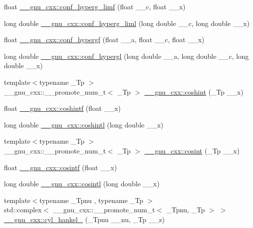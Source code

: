 \begin{DoxyCompactItemize}
\item 
float \hyperlink{group__gnu__math__spec__func_ga609879a370bc4e9fc70563806bc49cb9}{\+\_\+\+\_\+gnu\+\_\+cxx\+::conf\+\_\+hyperg\+\_\+limf} (float \+\_\+\+\_\+c, float \+\_\+\+\_\+x)
\item 
long double \hyperlink{group__gnu__math__spec__func_ga367be9b77eb1f9ccc2971d5300da48d1}{\+\_\+\+\_\+gnu\+\_\+cxx\+::conf\+\_\+hyperg\+\_\+liml} (long double \+\_\+\+\_\+c, long double \+\_\+\+\_\+x)
\item 
float \hyperlink{group__gnu__math__spec__func_gabd18e600aa78c3f2b2f835039506c810}{\+\_\+\+\_\+gnu\+\_\+cxx\+::conf\+\_\+hypergf} (float \+\_\+\+\_\+a, float \+\_\+\+\_\+c, float \+\_\+\+\_\+x)
\item 
long double \hyperlink{group__gnu__math__spec__func_ga0a9853f30d8fa515a12cd45a92da832e}{\+\_\+\+\_\+gnu\+\_\+cxx\+::conf\+\_\+hypergl} (long double \+\_\+\+\_\+a, long double \+\_\+\+\_\+c, long double \+\_\+\+\_\+x)
\item 
{\footnotesize template$<$typename \+\_\+\+Tp $>$ }\\\+\_\+\+\_\+gnu\+\_\+cxx\+::\+\_\+\+\_\+promote\+\_\+num\+\_\+t$<$ \+\_\+\+Tp $>$ \hyperlink{group__gnu__math__spec__func_gaceef7e29a05055fa1e1300301f51f139}{\+\_\+\+\_\+gnu\+\_\+cxx\+::coshint} (\+\_\+\+Tp \+\_\+\+\_\+x)
\item 
float \hyperlink{group__gnu__math__spec__func_ga1af4d48209169967a836bd97e625a128}{\+\_\+\+\_\+gnu\+\_\+cxx\+::coshintf} (float \+\_\+\+\_\+x)
\item 
long double \hyperlink{group__gnu__math__spec__func_ga6d24ab53fad13d421f07d9a9a509de14}{\+\_\+\+\_\+gnu\+\_\+cxx\+::coshintl} (long double \+\_\+\+\_\+x)
\item 
{\footnotesize template$<$typename \+\_\+\+Tp $>$ }\\\+\_\+\+\_\+gnu\+\_\+cxx\+::\+\_\+\+\_\+promote\+\_\+num\+\_\+t$<$ \+\_\+\+Tp $>$ \hyperlink{group__gnu__math__spec__func_gafa310665ffc65012269f6f90cb573502}{\+\_\+\+\_\+gnu\+\_\+cxx\+::cosint} (\+\_\+\+Tp \+\_\+\+\_\+x)
\item 
float \hyperlink{group__gnu__math__spec__func_ga87202351dc97d2c69e42bf58f911fb5a}{\+\_\+\+\_\+gnu\+\_\+cxx\+::cosintf} (float \+\_\+\+\_\+x)
\item 
long double \hyperlink{group__gnu__math__spec__func_ga5f01f17ae8859129860118b09d51791c}{\+\_\+\+\_\+gnu\+\_\+cxx\+::cosintl} (long double \+\_\+\+\_\+x)
\item 
{\footnotesize template$<$typename \+\_\+\+Tpnu , typename \+\_\+\+Tp $>$ }\\std\+::complex$<$ \+\_\+\+\_\+gnu\+\_\+cxx\+::\+\_\+\+\_\+promote\+\_\+num\+\_\+t$<$ \+\_\+\+Tpnu, \+\_\+\+Tp $>$ $>$ \hyperlink{group__gnu__math__spec__func_ga385def5d98679e243626fb78a841795b}{\+\_\+\+\_\+gnu\+\_\+cxx\+::cyl\+\_\+hankel\+\_} (\+\_\+\+Tpnu \+\_\+\+\_\+nu, \+\_\+\+Tp \+\_\+\+\_\+z)

\end{DoxyCompactItemize}

